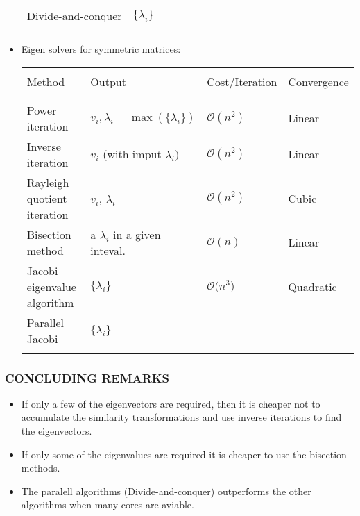 \documentclass[a4paper,8pt]{beamer} %
\begin{document}
\begin{frame}
\begin{itemize}
\begin{table}
\begin{Tiny}
\begin{tabular}{llll}
							Divide-and-conquer 			& $\{\lambda_i\}$ 	&  & \\
							\\
							\hline
							\hline
						\end{tabular}
					\end{Tiny}
				\end{table}
			\item Eigen solvers for symmetric matrices:
				\begin{table}
					\begin{Tiny}
						\centering
						\begin{tabular}{llll}
							\hline
							\hline
							\\
							Method & Output & Cost/Iteration & Convergence \\
							\\
							\hline
							\\
							Power iteration 			& $v_i, \lambda_{i}=\max{(\{\lambda_i\})}$ & $\mathcal O(n^{2})$& Linear\\ 
							Inverse iteration 			& $v_i$ (with imput $\lambda_{i})$ & $\mathcal O(n^2)$ & Linear\\ 
							Rayleigh quotient iteration & $v_i$, $\lambda_{i}$ & $\mathcal O(n^2)$ &	Cubic \\
							Bisection method 		& a $\lambda_i$ in a given inteval.	& $\mathcal O(n)$ & Linear \\
							Jacobi eigenvalue algorithm	& $\{\lambda_i\}$ 	& $\mathcal O\mathcal(n^3)$ & Quadratic \\
							Parallel Jacobi& $\{\lambda_i\}$ &  & \\
							\\
							\hline
							\hline
						\end{tabular}
					\end{Tiny}
				\end{table}
		\end{itemize}
\end{frame}%
\begin{frame}%
\frametitle{CONCLUDING REMARKS}
	\begin{itemize}
		\item If only a few of the eigenvectors are required, then it is cheaper not to accumulate the similarity 
			transformations and use inverse iterations to find the eigenvectors. 
		\item If only some of the eigenvalues are required it is cheaper to use the bisection methods.
		\item The paralell algorithms (Divide-and-conquer) outperforms the other algorithms when many cores are 
			aviable.
	\end{itemize}
\end{frame}%
\end{document}
